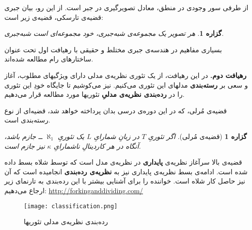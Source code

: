 \documentclass[12pt,a4paper]{article}
\theoremstyle{colorhead}
\newtheorem{prop}[thm]{گزاره}
\begin{document}
از طرفی سور وجودی در منطق، معادل تصویرگیری در جبر است. از این رو، بیان جبری قضیه‌ی تارسکی، قضیه‌ی زیر است:
\begin{prop}
هر تصویر یک مجموعه‌ی شبه‌جبری، خود مجموعه‌ای است شبه‌جبری.
\end{prop}
بسیاری مفاهیم در هندسه‌ی جبری مختلط و حقیقی با رهیافت اول تحت عنوان ساختارهای رام مطالعه شده‌اند. 
\par 
\noindent
\textbf{رهیافت دوم.}
در این رهیافت، از یک تئوری نظریه‌ی مدلی 
دارای 
ویژگیهای مطلوب،
 آغاز و سعی بر 
\textbf{رسته‌بندی }
مدلهای این تئوری می‌کنیم.
نیز می‌کوشیم تا جایگاه خودِ این تئوری را در 
\textbf{رده‌بندی 
نظریه‌ی مدلیِ 
}
تئوریها مورد مطالعه قرار می‌دهیم. 
\par 
قضیه‌ی مُرلی، که در این دوره‌ی درسی بدان پرداخته خواهد شد،
قضیه‌ای از  نوع رسته‌بندی است.
\begin{prop}[قضیه‌ی مُرلی]
اگر تئوریِ
$T$
در زبانِ شمارایِ
$L$
یک تئوریِ
$\aleph_1$ ــ
جازم باشد، آنگاه در هر کاردینالِ 
ناشمارایِ
$\kappa$
نیز جازم است. 
\end{prop}
قضیه‌ی بالا سرآغاز نظریه‌ی 
\textbf{پایداری}
در نظریه‌ی مدل است که توسط شلاه بسط داده شده است. 
ادامه‌ی بسط نظریه‌ی پایداری نیز به 
\textbf{نظریه‌ی رده‌بندی }
انجامیده است که آن نیز حاصل کار شلاه 
است.
خواننده را برای آشنایی بیشتر با این رده‌بندی به تارنمای زیر ارجاع می‌دهیم:
\newline
\url{http://forkinganddividing.com/}
\begin{figure}
\caption{رده‌بندی نظریه‌ی مدلی تئوریها}
\texttt{[image: classification.png]}
\end{figure}
\end{document}
